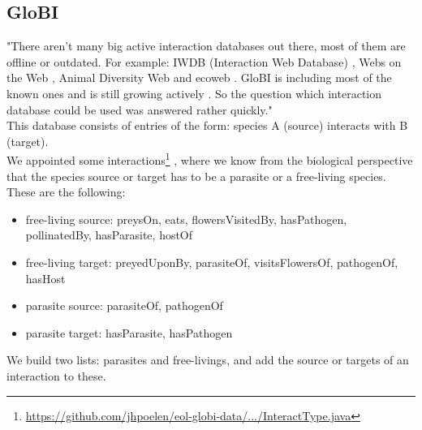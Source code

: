     \subsection{GloBI}
       "There aren't many big active interaction databases out there, most of them are 
        offline or outdated. For example: IWDB (Interaction Web Database) \cite{IWDB2003}, Webs on the 
        Web \cite{WOW2004}, Animal Diversity Web \cite{Myers2003} and ecoweb \cite{Cohen2010}. GloBI is 
        including most of the known ones and is still growing actively \cite{Poelen2014}. So the 
        question which interaction database could be used was answered rather quickly." \\

      This database consists of entries of the form: species A (source) interacts with B (target). \\
      We appointed some interactions\footnote{\hyperlink{
        https://github.com/jhpoelen/eol-globi-data/blob/master/eol-globi-lib/src/main/java/org/eol/globi/domain/InteractType.java
        }{https://github.com/jhpoelen/eol-globi-data/.../InteractType.java}}
        , where we know from the biological perspective that the species source or target has to be a 
        parasite or a free-living species. These are the following:
      \begin{itemize}
        \item free-living source: preysOn, eats, flowersVisitedBy, hasPathogen, pollinatedBy, 
          hasParasite, hostOf
        \item free-living target: preyedUponBy, parasiteOf, visitsFlowersOf, pathogenOf, hasHost
        \item parasite source: parasiteOf, pathogenOf
        \item parasite target: hasParasite, hasPathogen
      \end{itemize}
      We build two lists: parasites and free-livings, and add the source or targets of an interaction
        to these.

